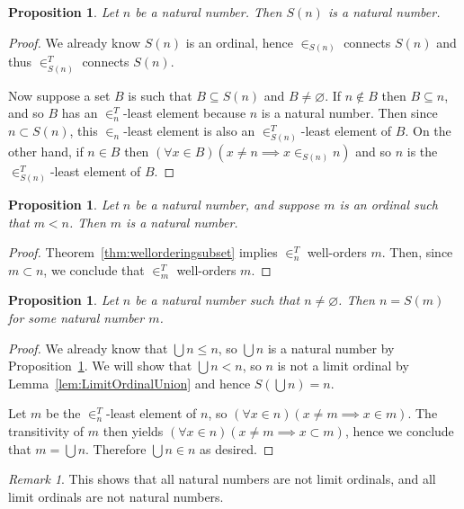 \documentclass[a4paper,11pt]{article}
\theoremstyle{plain}
\newtheorem{prop}[thm]{Proposition}
\theoremstyle{definition}
\theoremstyle{remark}
\newtheorem*{rem}{Remark}
\begin{document}
\begin{prop}
\label{prop:SuccessorOfNaturalIsNatural}
Let $n$ be a natural number. Then $S(n)$ is a natural number.
\end{prop}
\begin{proof}
We already know $S(n)$ is an ordinal, hence $\in_{S(n)}$ connects $S(n)$ and thus $\in_{S(n)}^T$ connects $S(n)$. 

Now suppose a set $B$ is such that $B\subseteq S(n)$ and $B\neq\varnothing$. If $n\notin B$ then $B\subseteq n$, and so $B$ has an $\in_{n}^T$-least element because $n$ is a natural number. Then since $n\subset S(n)$, this $\in_n$-least element is also an $\in_{S(n)}^T$-least element of $B$. On the other hand, if $n\in B$ then $(\forall x \in B)(x\neq n \implies x\in_{S(n)} n)$ and so $n$ is the $\in_{S(n)}^T$-least element of $B$.
\end{proof}

\begin{prop}
\label{prop:SmallerThanNaturalIsNatural}
Let $n$ be a natural number, and suppose $m$ is an ordinal such that $m < n$. Then $m$ is a natural number.
\end{prop}
\begin{proof}
Theorem~\ref{thm:wellorderingsubset} implies $\in_n^T$ well-orders $m$. Then, since $m \subset n$, we conclude that $\in_m^T$ well-orders $m$.
\end{proof}

\begin{prop}
\label{prop:NaturalAreSuccessorsOfNatural}
Let $n$ be a natural number such that $n \neq \varnothing$. Then $n = S(m)$ for some natural number $m$.
\end{prop}
\begin{proof}
We already know that $\bigcup n \leq n$, so $\bigcup n$ is a natural number by Proposition~\ref{prop:SmallerThanNaturalIsNatural}. We will show that $\bigcup n < n$, so $n$ is not a limit ordinal by Lemma~\ref{lem:LimitOrdinalUnion} and hence $S(\bigcup n) = n$.

Let $m$ be the $\in_n^T$-least element of $n$, so $(\forall x \in n)(x \neq m \implies x \in m)$. The transitivity of $m$ then yields $(\forall x \in n)(x \neq m \implies x \subset m)$, hence we conclude that $m = \bigcup n$. Therefore $\bigcup n \in n$ as desired.
\end{proof}
\begin{rem}
This shows that all natural numbers are not limit ordinals, and all limit ordinals are not natural numbers.
\end{rem}
\end{document}
